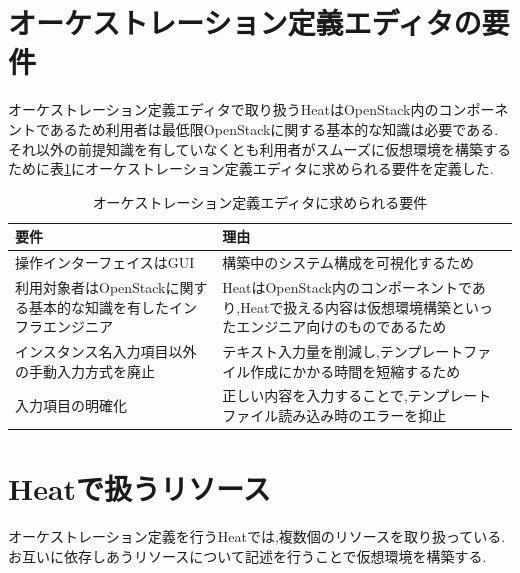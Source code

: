 \documentclass[mingoth]{kut-paper}		%
\begin{document}
	\section{オーケストレーション定義エディタの要件}
	オーケストレーション定義エディタで取り扱うHeatはOpenStack内のコンポーネントであるため利用者は最低限OpenStackに関する基本的な知識は必要である.それ以外の前提知識を有していなくとも利用者がスムーズに仮想環境を構築するために表\ref{table:3}にオーケストレーション定義エディタに求められる要件を定義した.
	\begin{table}[H]
		\begin{center}
			\caption{オーケストレーション定義エディタに求められる要件}
			\label{table:3}
			\begin{tabular}{|p{5cm}|p{7cm}|}\hline
				要件 & 理由\\ \hline \hline
				操作インターフェイスはGUI & 構築中のシステム構成を可視化するため\\ \hline
				利用対象者はOpenStackに関する基本的な知識を有したインフラエンジニア & HeatはOpenStack内のコンポーネントであり,Heatで扱える内容は仮想環境構築といったエンジニア向けのものであるため\\ \hline
				インスタンス名入力項目以外の手動入力方式を廃止 & テキスト入力量を削減し,テンプレートファイル作成にかかる時間を短縮するため\\ \hline
				入力項目の明確化 & 正しい内容を入力することで,テンプレートファイル読み込み時のエラーを抑止\\ \hline
			\end{tabular}
		\end{center}
	\end{table}
	\section{Heatで扱うリソース}
	オーケストレーション定義を行うHeatでは,複数個のリソースを取り扱っている.お互いに依存しあうリソースについて記述を行うことで仮想環境を構築する.
	
\end{document}
